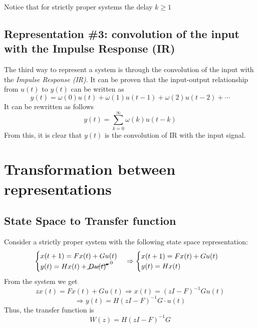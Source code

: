 \begin{remark}
    Notice that for strictly proper systems the delay $k \ge 1$
\end{remark}

\subsection{Representation \#3: convolution of the input with the Impulse Response (IR)}
The third way to represent a system is through the convolution of the input with the \emph{Impulse Response (IR)}.
It can be proven that the input-output relationship from $u(t)$ to $y(t)$ can be written as
\[ y(t) = \omega(0) u(t) + \omega(1) u(t-1) + \omega(2) u(t-2) + \cdots \]
It can be rewritten as follows
\[ y(t) = \sum_{k=0}^{\infty} \omega(k) u(t-k) \]
From this, it is clear that $y(t)$ is the convolution of IR with the input signal.

\section{Transformation between representations}
\subsection{State Space to Transfer function}
Consider a strictly proper system with the following state space representation:
\[
\begin{cases}
    x(t+1) = F x(t) + G u(t)\\
    y(t) = H x(t) + \cancelto{0}{D u(t)}\\
\end{cases}
\Rightarrow
\begin{cases}
    x(t+1) = F x(t) + G u(t)\\
    y(t) = H x(t)\\
\end{cases}
\]
From the system we get
\[ z x(t) = F x(t) + G u(t) \Rightarrow x(t) = (zI - F)^{-1} G u(t) \]
\[ \Rightarrow y(t) = H (zI - F)^{-1} G \cdot u(t) \]
Thus, the transfer function is
\[ W(z) = H(zI - F) ^ {-1} G \]

